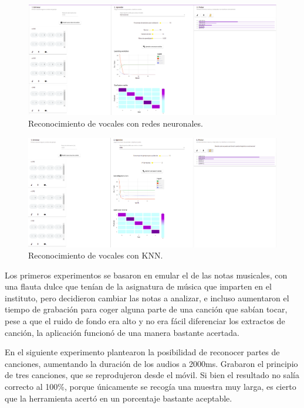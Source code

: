 \documentclass[a4paper, 12pt]{book}
\begin{document}
\begin{figure}
	\centering
	\includegraphics[width=14cm]{img/vocales-nn.png}
	\caption{Reconocimiento de vocales con redes neuronales.}\label{fig:reconocimiento-vocales-nn}
\end{figure}

\begin{figure}
	\centering
	\includegraphics[width=14cm]{img/vocales-knn.png}
	\caption{Reconocimiento de vocales con KNN.}\label{fig:reconocimiento-vocales-knn}
\end{figure}

Los primeros experimentos se basaron en emular el de las notas musicales, con una flauta dulce que tenían de la asignatura de música que imparten en el instituto, pero decidieron cambiar las notas a analizar, e incluso aumentaron el tiempo de grabación para coger alguna parte de una canción que sabían tocar, pese a que el ruido de fondo era alto y no era fácil diferenciar los extractos de canción, la aplicación funcionó de una manera bastante acertada.

En el siguiente experimento plantearon la posibilidad de reconocer partes de canciones, aumentando la duración de los audios a 2000ms. Grabaron el principio de tres canciones, que se reprodujeron desde el móvil. Si bien el resultado no salía correcto al 100\%, porque únicamente se recogía una muestra muy larga, es cierto que la herramienta acertó en un porcentaje bastante aceptable.
\end{document}
